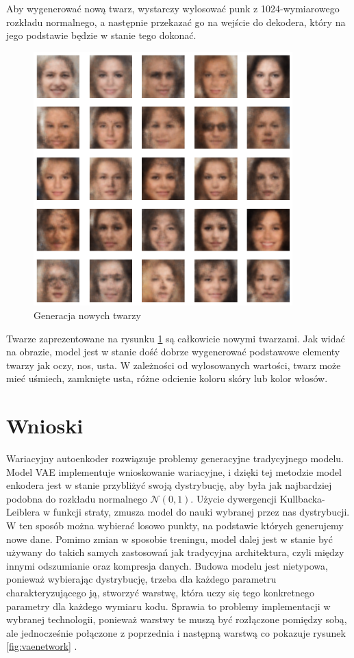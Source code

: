 \documentclass[a4paper,12pt,oneside]{book} %
\begin{document}
Aby wygenerować nową twarz, wystarczy wylosować punk z 1024-wymiarowego rozkładu normalnego, a następnie przekazać go na wejście do dekodera, który na jego podstawie będzie w stanie tego dokonać. 
\begin{figure}[h!]
	\centering\includegraphics[width=10cm]{generatedfaces.png}
	\caption{Generacja nowych twarzy}
	\label{fig:facegenvae}
\end{figure}

Twarze zaprezentowane na rysunku \ref{fig:facegenvae} są całkowicie nowymi twarzami. Jak widać na obrazie, model jest w stanie dość dobrze wygenerować podstawowe elementy twarzy jak oczy, nos, usta. W zależności od wylosowanych wartości, twarz może mieć uśmiech, zamknięte usta, różne odcienie koloru skóry lub kolor włosów.


\newpage
\section{Wnioski}
Wariacyjny autoenkoder rozwiązuje problemy generacyjne tradycyjnego modelu. Model VAE implementuje wnioskowanie wariacyjne, i dzięki tej metodzie model enkodera jest w stanie przybliżyć swoją dystrybucję, aby była jak najbardziej podobna do rozkładu normalnego $\mathcal{N}(0, 1)$. Użycie dywergencji Kullbacka-Leiblera w funkcji straty, zmusza model do nauki wybranej przez nas dystrybucji. W ten sposób można wybierać losowo punkty, na podstawie których generujemy nowe dane. Pomimo zmian w sposobie treningu, model dalej jest w stanie być używany do takich samych zastosowań jak tradycyjna architektura, czyli między innymi odszumianie oraz kompresja danych. Budowa modelu jest nietypowa, ponieważ wybierając dystrybucję, trzeba dla każdego parametru charakteryzującego ją, stworzyć warstwę, która uczy się tego konkretnego parametry dla każdego wymiaru kodu. Sprawia to problemy implementacji w wybranej technologii, ponieważ warstwy te muszą być rozłączone pomiędzy sobą, ale jednocześnie połączone z poprzednia i następną warstwą co pokazuje rysunek \ref{fig:vaenetwork} \cite{tikzvae}. 
\end{document}

